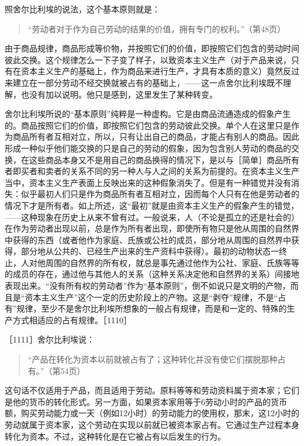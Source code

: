 照舍尔比利埃的说法，这个基本原则就是：

\begin{quote}{“劳动者对于作为自己劳动的结果的价值，拥有专门的权利。”（第48页）}\end{quote}

由于商品规律，商品形成等价物，并按照它们的价值，即按照它们包含的劳动时间彼此交换。这个规律怎么一下子变了样子，以致资本主义生产（对于产品来说，只有在资本主义生产的基础上，作为商品来进行生产，才具有本质的意义）竟然反过来建立在一部分劳动不经交换就被占有的基础上，——这一点舍尔比利埃既不理解，也没有加以说明。他只是感到，这里发生了某种转变。

舍尔比利埃所说的“基本原则”纯粹是一种虚构。它是由商品流通造成的假象产生的。商品按照它们的价值，即按照它们包含的劳动彼此交换。单个人在这里只是作为商品所有者互相对立，所以，只有让出自己的商品，才能占有别人的商品。因此形成一种似乎他们能交换的只是自己的劳动的假象，因为包含别人劳动的商品的交换，在这些商品本身又不是用自己的商品换得的情况下，是以与［简单］商品所有者即买者和卖者的关系不同的另一种人与人之间的关系为前提的。在资本主义生产当中，资本主义生产表面上反映出来的这种假象消失了。但是有一种错觉并没有消失：似乎最初人们只是作为商品所有者互相对立，因而每个人只有在他是劳动者的情况下才是所有者。如上所述，这“最初”就是由资本主义生产的假象产生的错觉，——这种现象在历史上从来不曾有过。一般说来，人（不论是孤立的还是社会的）在作为劳动者出现以前，总是作为所有者出现，即使所有物只是他从周围的自然界中获得的东西（或者他作为家庭、氏族或公社的成员，部分地从周围的自然界中获得，部分地从公共的、已经生产出来的生产资料中获得）。最初的动物状态一终止，人对他周围的自然界的所有权，就总是事先通过他作为公社、家庭、氏族等等的成员的存在，通过他与其他人的关系（这种关系决定他和自然界的关系）间接地表现出来。“没有所有权的劳动者”作为“基本原则”，倒不如说只是文明的产物，而且是“资本主义生产”这个一定的历史阶段上的产物。这是“剥夺”规律，不是“占有”规律，至少不是舍尔比利埃所想象的一般占有规律，而是和一定的、特殊的生产方式相适应的占有规律。［1110］

［1111］舍尔比利埃说：

\begin{quote}{“产品在转化为资本以前就被占有了；这种转化并没有使它们摆脱那种占有。”（第54页）}\end{quote}

这句话不仅适用于产品，而且适用于劳动。原料等等和劳动资料属于资本家；它们是他的货币的转化形式。另一方面，如果资本家用等于6劳动小时的产品的货币额，购买劳动能力或一天（例如12小时）的劳动能力的使用权，那末，这12小时的劳动就属于资本家，这个劳动在实现以前就已被资本家占有。它通过生产过程本身转化为资本。不过，这种转化是在它被占有以后发生的行为。


